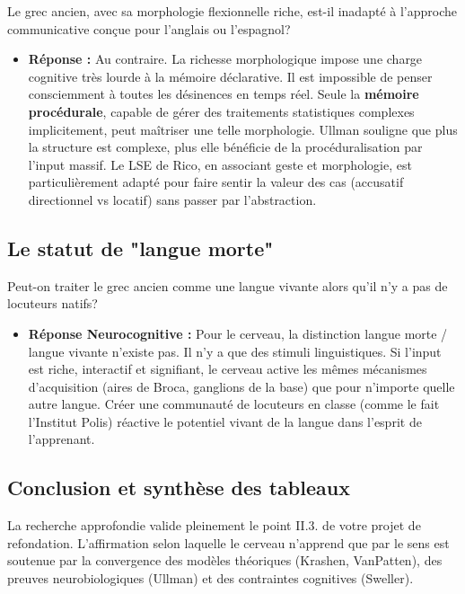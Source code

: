 Le grec ancien, avec sa morphologie flexionnelle riche, est-il inadapté à l'approche communicative
conçue pour l'anglais ou l'espagnol?

\begin{itemize}\item \textbf{Réponse :} Au contraire. La richesse morphologique impose une charge cognitive très lourde à la mémoire déclarative. Il est impossible de \og penser\fg{} consciemment à toutes les désinences en temps réel. Seule la \textbf{mémoire procédurale}, capable de gérer des traitements statistiques complexes implicitement, peut maîtriser une telle morphologie. Ullman souligne que plus la structure est complexe, plus elle bénéficie de la procéduralisation par l'input massif.\cite{II-3-3-ref19} Le LSE de Rico, en associant geste et morphologie, est particulièrement adapté pour \og faire sentir\fg{} la valeur des cas (accusatif directionnel vs locatif) sans passer par l'abstraction.\cite{II-3-3-ref53}\end{itemize}

\subsection{Le statut de "langue morte"}

Peut-on traiter le grec ancien comme une langue vivante alors qu'il n'y a pas de locuteurs natifs?

\begin{itemize}\item \textbf{Réponse Neurocognitive :} Pour le cerveau, la distinction \og langue morte\fg{} / \og langue vivante\fg{} n'existe pas. Il n'y a que des stimuli linguistiques. Si l'input est riche, interactif et signifiant, le cerveau active les mêmes mécanismes d'acquisition (aires de Broca, ganglions de la base) que pour n'importe quelle autre langue.\cite{II-3-3-ref55} Créer une communauté de locuteurs en classe (comme le fait l'Institut Polis) réactive le potentiel \og vivant\fg{} de la langue dans l'esprit de l'apprenant.\end{itemize}

\subsection{Conclusion et synthèse des tableaux}

La recherche approfondie valide pleinement le point II.3.\cite{II-3-3-ref3} de votre projet de
refondation. L'affirmation selon laquelle \og le cerveau n'apprend que par le sens\fg{} est soutenue
par la convergence des modèles théoriques (Krashen, VanPatten), des preuves neurobiologiques
(Ullman) et des contraintes cognitives (Sweller).

